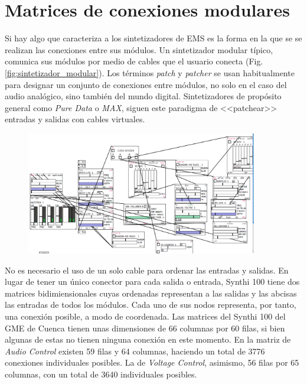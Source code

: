 \section{Matrices de conexiones modulares}

Si hay algo que caracteriza a los sintetizadores de EMS es la forma en la que se se realizan las conexiones entre sus módulos. Un sintetizador modular típico, comunica sus módulos por medio de cables que el usuario conecta (Fig. \ref{fig:sintetizador_modular}). Los términos \textit{patch} y \textit{patcher} se usan habitualmente para designar un conjunto de conexiones entre módulos, no solo en el caso del audio analógico, sino también del mundo digital. Sintetizadores de propósito general como \textit{Pure Data} o \textit{MAX}, siguen este paradigma de <<patchear>> entradas y salidas con cables virtuales.
	
\begin{figure}
	\centering
	\includegraphics[width=0.9\textwidth]{images/pd_patch_example}
	\caption[]{}
	\label{fig:pd_patch_example}
\end{figure}
	

No es necesario el uso de un solo cable para ordenar las entradas y salidas. En lugar de tener un único conector para cada salida o entrada, Synthi 100 tiene dos matrices bidimiensionales cuyas ordenadas representan a las salidas y las abcisas las entradas de todos los módulos. Cada uno de sus nodos representa, por tanto, una conexión posible, a modo de coordenada. Las matrices del Synthi 100 del GME de Cuenca tienen unas dimensiones de 66 columnas por 60 filas, si bien algunas de estas no tienen ninguna conexión en este momento. En la matriz de \textit{Audio Control} existen 59 filas y 64 columnas, haciendo un total de 3776 conexiones individuales posibles. La de \textit{Voltage Control}, asimismo, 56 filas por 65 columnas, con un total de 3640 individuales posibles.


